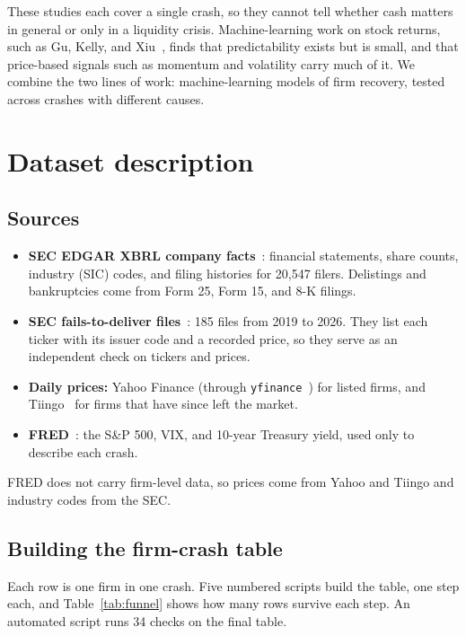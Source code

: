 \documentclass[11pt]{article}
\begin{document}
These studies each cover a single crash, so they cannot tell whether cash matters in general or only in a liquidity crisis. Machine-learning work on stock returns, such as Gu, Kelly, and Xiu~\cite{gu2020}, finds that predictability exists but is small, and that price-based signals such as momentum and volatility carry much of it. We combine the two lines of work: machine-learning models of firm recovery, tested across crashes with different causes.

\section{Dataset description}

\subsection{Sources}
\begin{itemize}
  \item \textbf{SEC EDGAR XBRL company facts}~\cite{secapi}: financial statements, share counts, industry (SIC) codes, and filing histories for 20,547 filers. Delistings and bankruptcies come from Form 25, Form 15, and 8-K filings.
  \item \textbf{SEC fails-to-deliver files}~\cite{secftd}: 185 files from 2019 to 2026. They list each ticker with its issuer code and a recorded price, so they serve as an independent check on tickers and prices.
  \item \textbf{Daily prices:} Yahoo Finance (through \texttt{yfinance}~\cite{yfinance}) for listed firms, and Tiingo~\cite{tiingo} for firms that have since left the market.
  \item \textbf{FRED}~\cite{fred}: the S\&P 500, VIX, and 10-year Treasury yield, used only to describe each crash.
\end{itemize}
FRED does not carry firm-level data, so prices come from Yahoo and Tiingo and industry codes from the SEC.

\subsection{Building the firm-crash table}
Each row is one firm in one crash. Five numbered scripts build the table, one step each, and Table~\ref{tab:funnel} shows how many rows survive each step. An automated script runs 34 checks on the final table.
\end{document}
